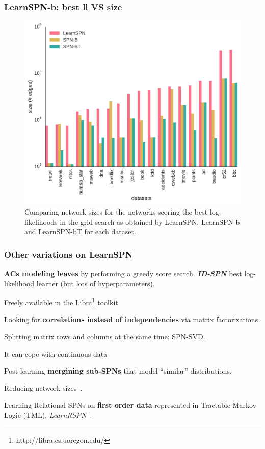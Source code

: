 \documentclass[10pt, t, xcolor={usenames,dvipsnames,svgnames}, compress]{beamer}
\begin{document}
\begin{frame}
  \frametitle{LearnSPN-b: best ll VS size}

  \begin{figure}[htbp]
    \begin{center}
      \includegraphics[width=0.65\linewidth]{figures/edges-comp.pdf}
      \caption{\footnotesize
        Comparing network sizes
        for the networks scoring the best log-likelihoods in the grid
        search as obtained by \textsf{LearnSPN}, \textsf{LearnSPN-b} and
        \textsf{LearnSPN-bT} for each dataset.}
    \end{center}
  \end{figure}
\end{frame}

\begin{frame}
  \frametitle{Other variations on LearnSPN}
  \textbf{ACs modeling leaves} by performing a greedy score
  search.
  \emph{\textbf{ID-SPN}} best log-likelihood learner (but lots of
  hyperparameters).\par
  Freely available in the \textsf{Libra}\footnote{http://libra.cs.uoregon.edu/} toolkit~\parencite{Rooshenas2014}\par\bigskip
  
  Looking for \textbf{correlations instead of independencies} via matrix
  factorizations.\par
  Splitting matrix rows and columns at the same time: SPN-SVD.\par
  It can cope with continuous data~\parencite{Adel2015}\par\bigskip
  
  Post-learning \textbf{mergining sub-SPNs} that model ``similar'' distributions.\par
  Reducing network sizes~\parencite{Rahman2016}.\par\bigskip

  Learning Relational SPNs on \textbf{first order data}
  represented in Tractable Markov Logic (TML), \emph{LearnRSPN}~\parencite{Nath2015}.
\end{frame}
\end{document}
